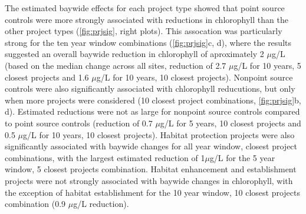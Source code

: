 \documentclass[]{article}
\begin{document}
The estimated baywide effects for each project type showed that point
source controls were more strongly associated with reductions in
chlorophyll than the other project types (\cref{fig:prjsig}, right
plots). This assocation was particularly strong for the ten year window
combinations (\cref{fig:prjsig}c, d), where the results suggested an
overall baywide reduction in chlorophyll of aproximately 2 \(\mu\)g/L
(based on the median change across all sites, reduction of 2.7
\(\mu\)g/L for 10 years, 5 closest projects and 1.6 \(\mu\)g/L for 10
years, 10 closest projects). Nonpoint source controls were also
significantly associated with chlorophyll reducutions, but only when
more projects were considered (10 closest project combinations,
\cref{fig:prjsig}b, d). Estimated reductions were not as large for
nonpoint source controls compared to point source controls (reduction of
0.7 \(\mu\)g/L for 5 years, 10 closest projects and 0.5 \(\mu\)g/L for
10 years, 10 closest projects). Habitat protection projects were also
significantly associated with baywide changes for all year window,
closest project combinations, with the largest estimated reduction of
1\(\mu\)g/L for the 5 year window, 5 closest projects combination.
Habitat enhancement and establishment projects were not strongly
associated with baywide changes in chlorophyll, with the exception of
habitat establishment for the 10 year window, 10 closest projects
combination (0.9 \(\mu\)g/L reduction).
\end{document}
